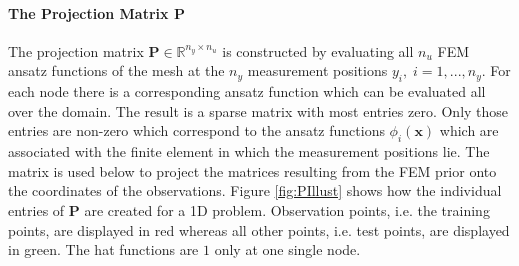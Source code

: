 \documentclass[%
  a4paper,oneside,%
  11pt,%
  smallchapters,
  style=printdev,
  extramargin,
  green,%
  rgb, <cmyk>
  ]{tubsbook}
\begin{document}
\paragraph{The Projection Matrix $\bm{P}$}
The projection matrix $\bm{P} \in \mathbb{R}^{n_y \times n_u}$ is constructed by evaluating all $n_u$ FEM ansatz functions of the mesh at the $n_y$ measurement positions $y_i, \; i=1,...,n_y$. For each node there is a corresponding ansatz function which can be evaluated all over the domain. The result is a sparse matrix with most entries zero. Only those entries are non-zero which correspond to the ansatz functions $\phi_i(\bm{\bm{x}})$ which are associated with the finite element in which the measurement positions lie. The matrix is used below to project the matrices resulting from the FEM prior onto the coordinates of the observations. Figure \ref{fig:PIllust} shows how the individual entries of $\bm{P}$ are created for a 1D problem. Observation points, i.e. the training points, are displayed in red whereas all other points, i.e. test points, are displayed in green. The hat functions are $1$ only at one single node.
%
\end{document}
